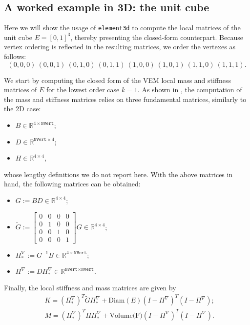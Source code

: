 \documentclass[a4paper]{article}
\begin{document}
\subsection{A worked example in 3D: the unit cube}
Here we will show the usage of \texttt{element3d} to compute the local matrices of the unit cube $E = [0,1]^3$, thereby presenting the closed-form counterpart.  Because vertex ordering is reflected in the resulting matrices, we order the vertexes as follows:
\begin{equation}
\label{cube_vertex_ordering}
(0, 0,0)\ 
(0,0, 1)\ 
(0,1, 0)\ 
(0, 1,1)\ 
(1 ,0,0)\ 
(1 ,0,1)\ 
(1 ,1,0)\ 
(1 ,1,1).
\end{equation}

\noindent
We start by computing the closed form of the VEM local mass and stiffness matrices of $E$ for the lowest order case $k=1$.  As shown in \cite{hitchhikers}, the computation of the mass and stiffness matrices relies on three fundamental matrices, similarly to the 2D case:
\begin{itemize}
\item $B \in \mathbb{R}^{4\times\texttt{NVert}}$;
\item $D \in \mathbb{R}^{\texttt{NVert} \times 4}$;
\item $H \in\mathbb{R}^{4\times 4}$,
\end{itemize}
whose lengthy definitions we do not report here. With the above matrices in hand, the following matrices can be obtained:
\begin{itemize}
\item $G := BD \in\mathbb{R}^{4\times 4}$;
\item $\widetilde{G} := \left[\begin{array}{cccc}
0 & 0 & 0 & 0\\ 0 & 1 & 0 & 0\\ 0 & 0 & 1 & 0\\ 0 & 0 & 0 & 1
\end{array}\right] G \in\mathbb{R}^{4\times 4}$;
\item $\Pi^\nabla_* := G^{-1}B \in \mathbb{R}^{4\times\texttt{NVert}}$;
\item $\Pi^\nabla := D\Pi^\nabla_* \in \mathbb{R}^{\texttt{NVert}\times\texttt{NVert}}$.
\end{itemize}

\noindent
Finally, the local stiffness and mass matrices are given by
\begin{align}
&K = (\Pi^\nabla_*)^T \widetilde{G} \Pi^\nabla_* + \text{Diam}(E)(I-\Pi^\nabla)^T(I-\Pi^\nabla);\\
&M = (\Pi^\nabla_*)^T H \Pi^\nabla_* + \text{Volume(F)}(I-\Pi^\nabla)^T(I-\Pi^\nabla).
\end{align}
\end{document}

